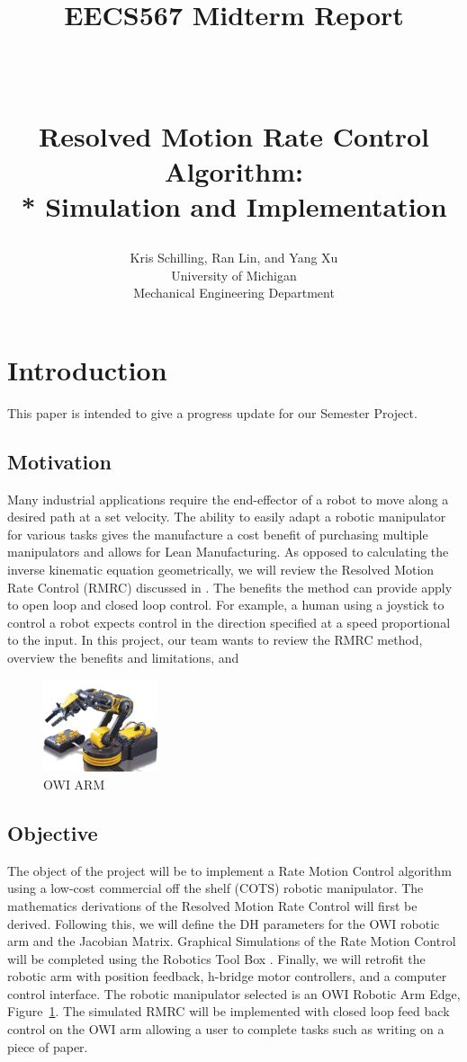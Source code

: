 \documentclass[paper=letter, fontsize=10pt]{scrartcl}	%
\title{ \vspace{-.25in} 	\usefont{OT1}{bch}{b}{n}
		\huge \strut EECS567 Midterm Report \strut \\
		\Large \bfseries \strut Resolved Motion Rate Control Algorithm: \\* Simulation and Implementation  \strut
}
\author{ 									\usefont{OT1}{bch}{m}{n}
        Kris Schilling, Ran Lin, and Yang Xu\\		\usefont{OT1}{bch}{m}{n}
        University of Michigan\\	\usefont{OT1}{bch}{m}{n}
        Mechanical Engineering Department\\
}
\date{}
\numberwithin{equation}{section}															%
\numberwithin{figure}{section}																%
\numberwithin{table}{section}																%
\begin{document}
\maketitle
\section{Introduction}
This paper is intended to give a progress update for our Semester Project. 

\subsection{Motivation}
Many industrial applications require the end-effector of a robot to move along a desired path at a set velocity. The ability to easily adapt a robotic manipulator for various tasks gives the manufacture a cost benefit of purchasing multiple manipulators and allows for Lean Manufacturing. As opposed to calculating the inverse kinematic equation geometrically, we will review the Resolved Motion Rate Control (RMRC) discussed in \cite{whitney1969resolved}. The benefits the method can provide apply to open loop and closed loop control. For example, a human using a joystick to control a robot expects control in the direction specified at a speed proportional to the input. In this project, our team wants to review the RMRC method, overview the benefits and limitations, and

\begin{figure}[h!]
  \centering
    \includegraphics[width=0.3\textwidth]{./Images/OWI}
    \caption{OWI ARM}
    \label{fig:OWI}
\end{figure}

\subsection{Objective}
The object of the project will be to implement a Rate Motion Control algorithm using a low-cost commercial off the shelf (COTS) robotic manipulator. The mathematics derivations of the Resolved Motion Rate Control will first be derived. Following this, we will define the DH parameters for the OWI robotic arm and the Jacobian Matrix. Graphical Simulations of the Rate Motion Control will be completed using the Robotics Tool Box \cite{corke1996robotics}. Finally, we will retrofit the robotic arm with position feedback, h-bridge motor controllers, and a computer control interface. The robotic manipulator selected is an OWI Robotic Arm Edge, Figure~\ref{fig:OWI}. The simulated RMRC will be implemented with closed loop feed back control on the OWI arm allowing a user to complete tasks such as writing on a piece of paper. 
\end{document}
